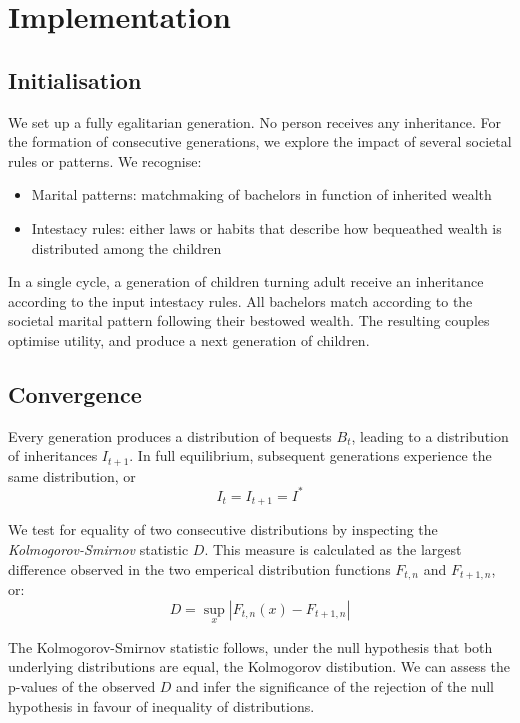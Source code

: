 \section{Implementation}
\subsection{Initialisation}
We set up a fully egalitarian generation. No person receives any inheritance. For the formation of consecutive generations, we explore the impact of several societal rules or patterns. We recognise:

\begin{itemize}
    \item Marital patterns: matchmaking of bachelors in function of inherited wealth
    \item Intestacy rules: either laws or habits that describe how bequeathed wealth is distributed among the children
\end{itemize}

In a single cycle, a generation of children turning adult receive an inheritance according to the input intestacy rules. All bachelors match according to the societal marital pattern following their bestowed wealth. The resulting couples optimise utility, and produce a next generation of children.

\subsection{Convergence}
Every generation produces a distribution of bequests $B_t$, leading to a distribution of inheritances $I_{t+1}$. In full equilibrium, subsequent generations experience the same distribution, or
\begin{equation}
    I_t = I_{t+1} = I^*
\end{equation}

We test for equality of two consecutive distributions by inspecting the \emph{Kolmogorov-Smirnov} statistic $D$. This measure is calculated as the largest difference observed in the two emperical distribution functions $F_{t,n}$ and $F_{t+1,n}$, or:
\begin{equation}
    D = \sup_x \left| F_{t,n}(x) - F_{t+1,n} \right|
\end{equation}

The Kolmogorov-Smirnov statistic follows, under the null hypothesis that both underlying distributions are equal, the Kolmogorov distibution. We can assess the p-values of the observed $D$ and infer the significance of the rejection of the null hypothesis in favour of inequality of distributions.

